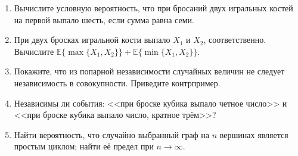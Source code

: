 \documentclass[a4paper,12pt]{article}
\begin{document}
\newpage

\begin{tasknum}{2}
	\begin{enumerate}
	\item Вычислите условную вероятность, что при бросаний двух игральных костей на первой выпало шесть, если сумма равна семи.
	
	\item При двух бросках игральной кости выпало $X_1$ и $X_2$, соответственно. Вычислите $\mathbb{E}\{\max\{X_1,X_2\}\} + \mathbb{E}\{\min\{X_1,X_2\}\}$.
	
	\item Покажите, что из попарной независимости случайных величин не следует независимость в совокупности. Приведите контрпример.
	
	\item Независимы ли события: <<при броске кубика выпало четное число>> и <<при броске кубика выпало число, кратное трём>>?
	
	\item Найти вероятность, что случайно выбранный граф на $n$ вершинах является простым циклом; найти её предел при $n\rightarrow \infty$.
\end{enumerate}
\end{tasknum}
\end{document}
